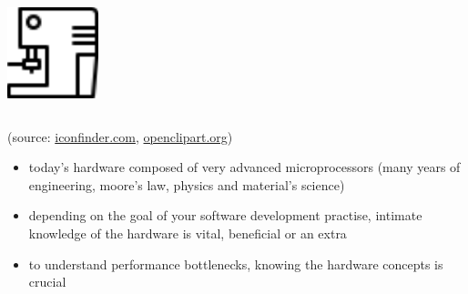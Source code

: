 \documentclass[9pt,xcolor=table]{beamer}
\begin{document}
\begin{frame}
\begin{columns}[c]
\begin{column}{.35\textwidth}
    \begin{center}
      \includegraphics[height=0.3\textheight]{img/iconfinder_coffee_machine}
    \end{center}
  \end{column}
\end{columns}
\begin{center}
  \small (source: \href{www.iconfinder.com}{iconfinder.com},
  \href{openclipart.org}{openclipart.org})
\end{center}
\begin{itemize}\large
\item<1-> today's hardware composed of very advanced microprocessors (many years of engineering, moore's law, physics and material's science)
\item<2-> depending on the goal of your software development practise, intimate knowledge of the hardware is vital, beneficial or an extra
\item<3-> to understand performance bottlenecks, knowing the hardware concepts is crucial 
\end{itemize}

\end{frame}
\end{document}
